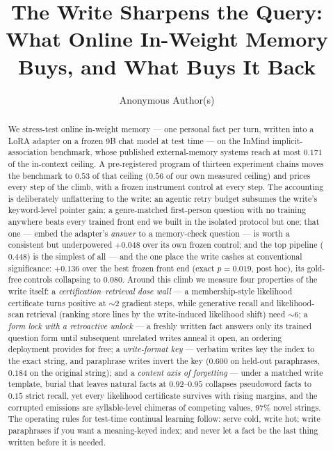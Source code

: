 \documentclass{article}
\title{The Write Sharpens the Query:\\ What Online In-Weight Memory Buys, and What Buys It Back}
\author{Anonymous Author(s)}
\begin{document}
\maketitle

\begin{abstract}
We stress-test online in-weight memory --- one personal fact per turn, written into a LoRA
adapter on a frozen 9B chat model at test time --- on the InMind implicit-association
benchmark, whose published external-memory systems reach at most $0.171$ of the in-context
ceiling. A pre-registered program of thirteen experiment chains moves the benchmark to
$0.53$ of that ceiling ($0.56$ of our own measured ceiling) and prices every step of the
climb, with a frozen instrument control at every step. The accounting is
deliberately unflattering to the write: an agentic retry budget subsumes the write's
keyword-level pointer gain; a genre-matched first-person question with no training anywhere
beats every trained front end we built in the isolated protocol but one; that one --- embed the adapter's
\emph{answer} to a memory-check question --- is worth a consistent but underpowered
$+0.048$ over its own frozen control; and the top pipeline ($0.448$) is the simplest of
all --- and the one place the write cashes at conventional significance: $+0.136$ over
the best frozen front end (exact $p{=}0.019$, post hoc), its gold-free controls
collapsing to $0.080$. Around this climb we measure four properties of the write
itself: a \emph{certification--retrieval dose wall} --- a membership-style likelihood
certificate turns positive at ${\sim}2$ gradient steps, while generative recall and
likelihood-scan retrieval (ranking store lines by the write-induced likelihood shift) need
${\sim}6$; a \emph{form lock with a retroactive unlock} --- a freshly written fact answers
only its trained question form until subsequent unrelated writes anneal it open, an
ordering deployment provides for free; a \emph{write-format key} --- verbatim writes key
the index to the exact string, and paraphrase writes invert the key ($0.600$ on held-out
paraphrases, $0.184$ on the original string); and a \emph{content axis of forgetting} ---
under a matched write template, burial that leaves natural facts at $0.92$--$0.95$
collapses pseudoword facts to $0.15$ strict recall, yet every likelihood certificate survives with rising
margins, and the corrupted emissions are syllable-level chimeras of competing values,
$97\%$ novel strings. The operating rules for test-time continual learning follow: serve
cold, write hot; write paraphrases if you want a meaning-keyed index; and never let a fact
be the last thing written before it is needed.
\end{abstract}
\end{document}
